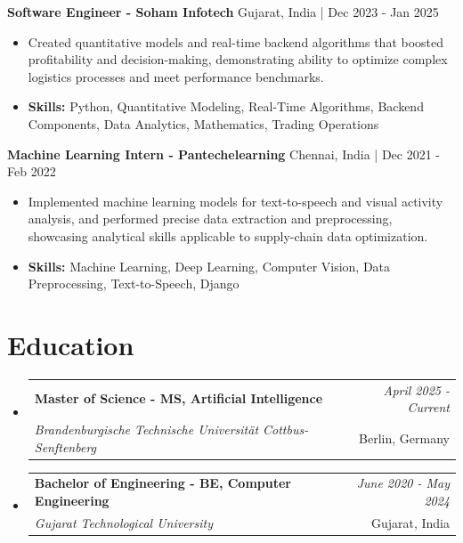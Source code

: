 \documentclass[a4paper,11pt]{article}
\makeatletter
\newcommand{\resumeSubheading}[4]{
\vspace{0.5mm}\item
    \begin{tabular*}{\linewidth}[t]{l@{\extracolsep{\fill}}r}
        \textbf{#1} & \textit{\footnotesize{#4}} \\
        \textit{\footnotesize{#3}} &  \footnotesize{#2}\\
    \end{tabular*}
    \vspace{-2.4mm}
}
\makeatother
\begin{document}
\vspace{1mm}
  \textbf{Software Engineer - Soham Infotech} \hfill Gujarat, India | Dec 2023 - Jan 2025
\vspace{-1.5mm} %
\begin{itemize}
  \item Created quantitative models and real-time backend algorithms that boosted profitability and decision-making, demonstrating ability to optimize complex logistics processes and meet performance benchmarks.

\vspace{-2mm}
  \item \textbf{Skills:} Python, Quantitative Modeling, Real-Time Algorithms, Backend Components, Data Analytics, Mathematics, Trading Operations
\end{itemize}

\vspace{1mm}
  \textbf{Machine Learning Intern - Pantechelearning} \hfill Chennai, India | Dec 2021 - Feb 2022
\vspace{-1.5mm} %
\begin{itemize}
  \item Implemented machine learning models for text-to-speech and visual activity analysis, and performed precise data extraction and preprocessing, showcasing analytical skills applicable to supply-chain data optimization.
\vspace{-2mm}
  \item \textbf{Skills:} Machine Learning, Deep Learning, Computer Vision, Data Preprocessing, Text-to-Speech, Django
\end{itemize}\section{\textbf{Education}}
\vspace{-0.4mm}

\begin{itemize}[leftmargin=0.15in, label={}]
\resumeSubheading
{Master of Science - MS, Artificial Intelligence }{Berlin, Germany}
{Brandenburgische Technische Universität Cottbus-Senftenberg  }{April 2025 - Current}

\vspace{1.0mm} %
\resumeSubheading
{Bachelor of Engineering - BE, Computer Engineering  }{Gujarat, India}
{Gujarat Technological University }{June 2020 - May 2024}

\end{itemize}
\end{document}
